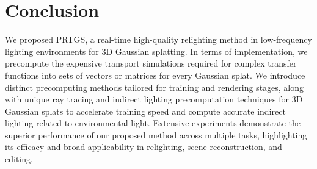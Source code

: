 \section{Conclusion}
\label{sec:conclusion}

We proposed PRTGS, a real-time high-quality relighting method in low-frequency lighting environments for 3D Gaussian splatting. In terms of implementation, we precompute the expensive transport simulations required for complex transfer functions into sets of vectors or matrices for every Gaussian splat. We introduce distinct precomputing methods tailored for training and rendering stages, along with unique ray tracing and indirect lighting precomputation techniques for 3D Gaussian splats to accelerate training speed and compute accurate indirect lighting related to environmental light.
Extensive experiments demonstrate the superior performance of our proposed method across multiple tasks, highlighting its efficacy and broad applicability in relighting, scene reconstruction, and editing.

